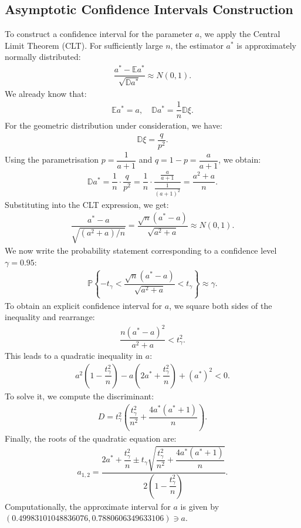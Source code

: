 \documentclass[final,3p,times,onecolumn]{elsarticle}
\begin{document}
\subsection{Asymptotic Confidence Intervals Construction}
To construct a confidence interval for the parameter $a$, we apply the Central Limit Theorem (CLT). 
For sufficiently large $n$, the estimator $a^*$ is approximately normally distributed:
\begin{gather*}
\dfrac{a^* - \mathbb{E}a^*}{\sqrt{\mathbb{D}a^*}} \approx N(0, 1).
\end{gather*}
We already know that:
\begin{gather*}
\mathbb{E}a^* = a, \quad 
\mathbb{D}a^* = \dfrac{1}{n}\mathbb{D}\xi.
\end{gather*}
For the geometric distribution under consideration, we have:
\begin{gather*}
\mathbb{D}\xi = \dfrac{q}{p^2}.
\end{gather*}
Using the parametrisation $p = \dfrac{1}{a + 1}$ and $q = 1 - p = \dfrac{a}{a+1}$, we obtain:
\begin{gather*}
\mathbb{D}a^* = \dfrac{1}{n} \cdot \dfrac{q}{p^2}
= \dfrac{1}{n} \cdot \dfrac{\frac{a}{a+1}}{\frac{1}{(a+1)^2}}
= \dfrac{a^2 + a}{n}.
\end{gather*}
Substituting into the CLT expression, we get:
\begin{gather*}
\dfrac{a^* - a}{\sqrt{(a^2 + a)/n}} 
= \dfrac{\sqrt{n}(a^* - a)}{\sqrt{a^2 + a}} 
\approx N(0, 1).
\end{gather*}
We now write the probability statement corresponding to a confidence level $\gamma = 0.95$:
\begin{gather*}
\mathbb{P}\left\{ 
- t_{\gamma} < 
\dfrac{\sqrt{n}(a^* - a)}{\sqrt{a^2 + a}} 
< t_{\gamma}
\right\} \approx \gamma.
\end{gather*}
To obtain an explicit confidence interval for $a$, we square both sides of the inequality and rearrange:
\begin{gather*}
\dfrac{n(a^* - a)^2}{a^2 + a} < t_{\gamma}^2.
\end{gather*}
This leads to a quadratic inequality in $a$:
\begin{gather*}
a^2\left(1 - \dfrac{t_{\gamma}^2}{n}\right) 
- a\left(2a^* + \dfrac{t_{\gamma}^2}{n}\right) 
+ (a^*)^2 < 0.
\end{gather*}
To solve it, we compute the discriminant:
\begin{gather*}
D = t_{\gamma}^2\left(
\dfrac{t_{\gamma}^2}{n^2} + \dfrac{4a^*(a^* + 1)}{n}
\right).
\end{gather*}
Finally, the roots of the quadratic equation are:
\begin{gather*}
a_{1,2} = 
\dfrac{
2a^* + \dfrac{t_{\gamma}^2}{n} 
\pm 
t_{\gamma}\sqrt{
\dfrac{t_{\gamma}^2}{n^2} + \dfrac{4a^*(a^* + 1)}{n}
}
}{
2\left(1 - \dfrac{t_{\gamma}^2}{n}\right)
}.
\end{gather*}
Computationally, 
the approximate interval for $a$ is given by $(0.49983101048836076, 0.7880606349633106) \ni a$.
\end{document}
